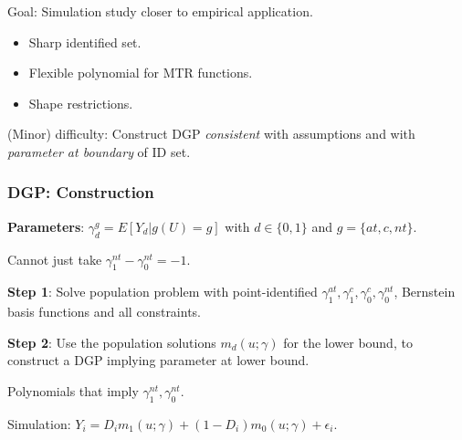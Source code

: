 \documentclass[11pt, aspectratio=169]{beamer}
\begin{document}
\begin{frame}
    Goal: Simulation study closer to empirical application.

    \vspace{0.5cm}
    \pause

    \begin{itemize}
        \item Sharp identified set.
        \item Flexible polynomial for MTR functions.
        \item Shape restrictions.
    \end{itemize}

    \vspace{0.5cm}

    (Minor) difficulty: Construct DGP \textit{consistent} with assumptions and with \textit{parameter at boundary} of ID set.
\end{frame}

\begin{frame}
    \frametitle{DGP\@: Construction}


    \textbf{Parameters}: $\gamma_d^g = E[Y_d|g(U)=g]$ with $d\in\{0,1\}$ and $g = \{at, c, nt\}$.

    \vspace{0.5cm}

    \footnotesize{Cannot just take $\gamma_1^{nt} - \gamma_0^{nt} = -1$.}

    \vspace{0.5cm}

    \normalsize

    \textbf{Step 1}: Solve population problem with point-identified $\gamma_1^{at}, \gamma_1^c, \gamma_0^c, \gamma_0^{nt}$, Bernstein basis functions and all constraints.

    \vspace{0.5cm}

    \textbf{Step 2}: Use the population solutions $m_d(u;\gamma)$ for the lower bound, to construct a DGP implying parameter at lower bound.

    \vspace{0.5cm}

    \footnotesize{Polynomials that imply $\gamma_1^{nt}, \gamma_0^{nt}$.}

    \vspace{0.5cm}

    Simulation: $Y_i = D_i m_1(u;\gamma) + (1-D_i)m_0(u;\gamma) + \epsilon_i$.
\end{frame}
\end{document}
